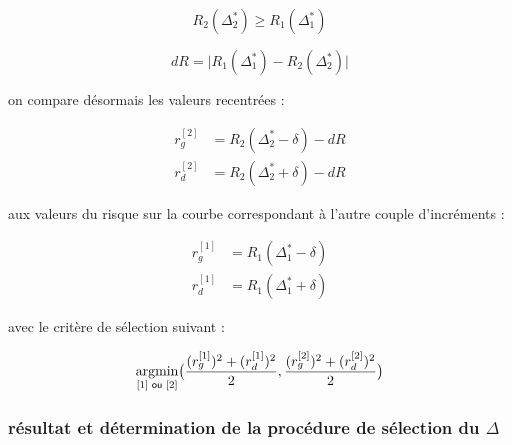 \begin{equation*}
	R_2(\Delta^*_2) \geq R_1(\Delta^*_1)
\end{equation*}

\begin{equation*}	
	dR = \bigl\vert R_1(\Delta^*_1) - R_2(\Delta^*_2) \bigr\vert
\end{equation*}

on compare désormais les valeurs recentrées :

\begin{align*}
	r_g^{[2]} & = R_2(\Delta^*_2 - \delta) - dR \\
	r_d^{[2]} & = R_2(\Delta^*_2 + \delta) - dR
\end{align*}

aux valeurs du risque sur la courbe correspondant à l'autre couple d'incréments :

\begin{align*}
	r_g^{[1]} & = R_1(\Delta^*_1 - \delta) \\
	r_d^{[1]} & = R_1(\Delta^*_1 + \delta)
\end{align*}

avec le critère de sélection suivant :


\begin{equation*}
	\argmin\limits_{[1] \textsf{ ou } [2]} \bigl( \frac{(r_g^{[1]})^2 + (r_d^{[1]})^2}{2}, \frac{(r_g^{[2]})^2 + (r_d^{[2]})^2}{2}  \bigr)
\end{equation*}


\subsubsection{résultat et détermination de la procédure de sélection du $\Delta$}
\label{sec:proc_delta}

